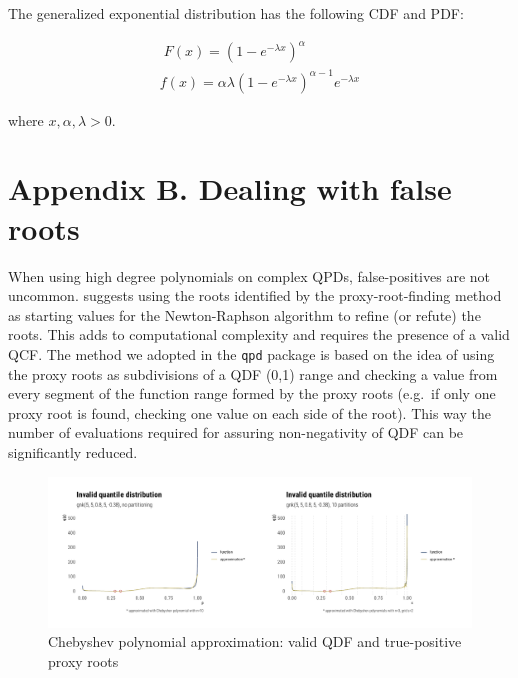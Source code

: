 \documentclass[
  12pt,
]{article}
\begin{document}
The generalized exponential distribution has the following CDF and PDF:

\[
\begin{gathered}\;
F(x)=(1-e^{-\lambda x})^\alpha \\
f(x)=\alpha\lambda(1-e^{-\lambda x})^{\alpha-1}e^{-\lambda x}
\end{gathered}
\]

where \(x, \alpha, \lambda>0\).

\hypertarget{appendix-b.-dealing-with-false-roots}{%
\section*{Appendix B. Dealing with false roots}\label{appendix-b.-dealing-with-false-roots}}

When using high degree polynomials on complex QPDs, false-positives are not uncommon. \citet{boyd2006ComputingRealRoots} suggests using the roots identified by the proxy-root-finding method as starting values for the Newton-Raphson algorithm to refine (or refute) the roots. This adds to computational complexity and requires the presence of a valid QCF. The method we adopted in the \texttt{qpd} package is based on the idea of using the proxy roots as subdivisions of a QDF (0,1) range and checking a value from every segment of the function range formed by the proxy roots (e.g.~if only one proxy root is found, checking one value on each side of the root). This way the number of evaluations required for assuring non-negativity of QDF can be significantly reduced.

\begin{figure}

{\centering \includegraphics{ilbm_article_files/figure-latex/chebyshev-roots-gnk-graph-1} 

}

\caption{Chebyshev polynomial approximation: valid QDF and true-positive proxy roots}\label{fig:chebyshev-roots-gnk-graph}
\end{figure}
\end{document}
